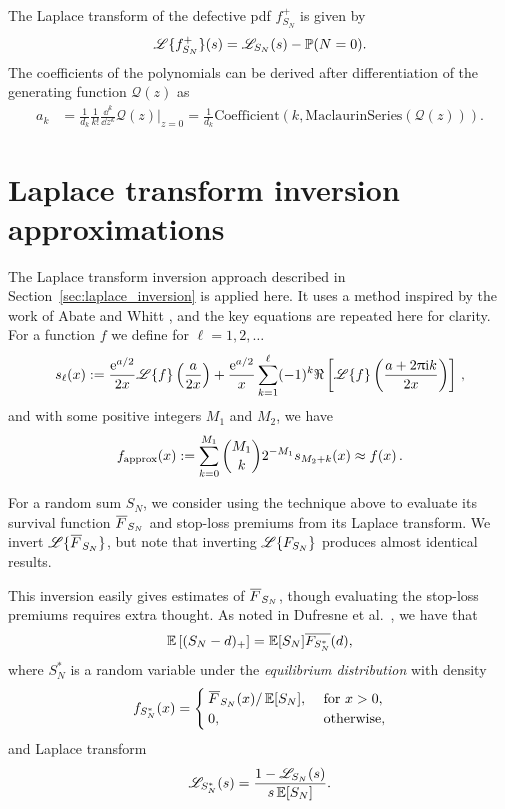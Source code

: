 The Laplace transform of the defective pdf $f_{S_N}^{+}$ is given by
$$
\mathscr{L}\{f_{S_N}^{+}\}(s)=\mathscr{L}_{S_N}(s)-\operatorname{{\mathbb P}}(N=0).
$$
The coefficients of the polynomials can be derived after differentiation of the generating function $\mathcal{Q}(z)$ as
\begin{align*}\label{eq:PolynomialExpansionCoefficientDerivativeGeneratingFunction}
a_k&=\frac{1}{d_k}\frac{1}{k!}\frac{\dd^{k}}{\dd z^{k}}\mathcal{Q}(z)\Big\rvert_{z=0}  =\frac{1}{d_k} \text{Coefficient}(k, \text{MaclaurinSeries}(\mathcal{Q}(z))).
\end{align*}

\section{Laplace transform inversion approximations}\label{sec:NumericalInversionLaplaceTransform}

The Laplace transform inversion approach described in Section~\ref{sec:laplace_inversion} is applied here. It uses a method inspired by the work of Abate and Whitt \cite{Abate1992}, and the key equations are repeated here for clarity. For a function $f$ we define for $\ell=1,2,\dots$
\begin{equation*}
s_\ell(x) := \frac{\mathrm{e}^{a/2}}{2x}\mathscr{L}\{f\} \left(\frac{a}{2 x}\right) + \frac{\mathrm{e}^{a/2}}{x} \sum_{k=1}^\ell (-1)^{k} \Re\left[\mathscr{L}\{f\}\left(\frac{a+ 2\uppi \mathrm{i} k}{2 x}\right)\right] \,,
\end{equation*}
and with some positive integers $M_1$ and $M_2$, we have
\begin{equation} \label{eq:LaplaceInversion}
f_{\text{approx}}(x) := \sum_{k=0}^{M_1} \binom{M_1}{k} 2^{-M_1} s_{M_2+k}(x) \approx f(x) \,.
\end{equation}

For a random sum $S_N$, we consider using the technique above to evaluate its survival function $\Ftail_{S_N}$ and stop-loss premiums from its Laplace transform.
We invert $\LT{\Ftail_{S_N}}$, but note that inverting $\mathscr{L}\{F_{S_N}\}$ produces almost identical results.

This inversion easily gives estimates of $\Ftail_{S_N}$, though evaluating the stop-loss premiums requires extra thought.
As noted in Dufresne et al.\ \cite{DuGaMo09}, we have that
\begin{equation}\label{eq:LinkStopLossPremiumEquilibriumDistribution}
\operatorname{{\mathbb E}}\left[(S_N-d)_{+}\right]=\operatorname{{\mathbb E}}[S_N]\overline{F_{S_N^{\ast}}}(d),
\end{equation}
where $S_N^{\ast}$ is a random variable under the \emph{equilibrium distribution} with density
\begin{equation*}
f_{S_N^{\ast}}(x)=\begin{cases}
\Ftail_{S_N}(x) / \Exp[S_N],&\text{ for }x>0,\\
0,&\text{ otherwise},
\end{cases}
\end{equation*}
and Laplace transform
\begin{equation*}\label{eq:LaplaceTransformEquilibriumDistribution}
\mathscr{L}_{S_N^{\ast}}(s)=\frac{1-\mathscr{L}_{S_N}(s)}{s\operatorname{{\mathbb E}}[S_N]}.
\end{equation*}

